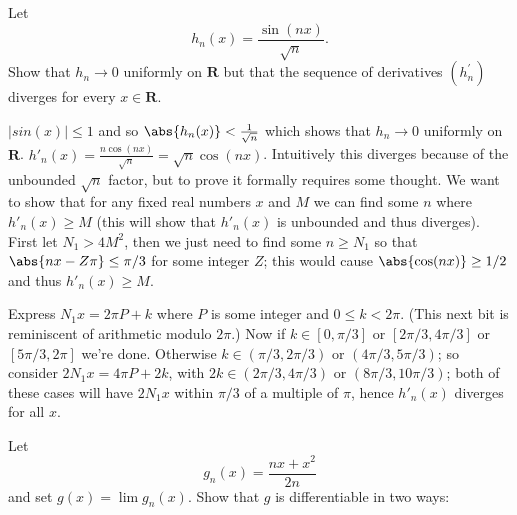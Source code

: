 \begin{exercise}
  Let
  $$
  h_{n}(x)=\frac{\sin (n x)}{\sqrt{n}} .
  $$
  Show that $h_{n} \rightarrow 0$ uniformly on $\mathbf{R}$ but that the sequence of derivatives $\left(h_{n}^{\prime}\right)$ diverges for every $x \in \mathbf{R}$.
\end{exercise}
\begin{solution}
\(|sin(x)| \leq 1\) and so \(\abs{h_n(x)} < \frac{1}{\sqrt{n}}\) which shows that \(h_n \to 0\) uniformly on \(\mathbf{R}\). \(h'_n(x) = \frac{n\cos(nx)}{\sqrt{n}} = \sqrt{n} \cos(nx)\). Intuitively this diverges because of the unbounded \(\sqrt{n}\) factor, but to prove it formally requires some thought. We want to show that for any fixed real numbers \(x\) and \(M\) we can find some \(n\) where \(h'_n(x) \geq M\) (this will show that \(h'_n(x)\) is unbounded and thus diverges). First let \(N_1 > 4M^2\), then we just need to find some \(n \geq N_1\) so that \(\abs{nx - Z\pi} \leq \pi/3\) for some integer \(Z\); this would cause \(\abs{\cos(nx)} \geq 1/2\) and thus \(h'_n(x) \geq M\).

Express \(N_1 x = 2 \pi P + k\) where \(P\) is some integer and \(0 \leq k < 2 \pi\). (This next bit is reminiscent of arithmetic modulo \(2\pi\).) Now if \(k \in [0, \pi/3]\) or \([2\pi/3, 4\pi/3]\) or \([5\pi/3, 2\pi]\) we're done. Otherwise \(k \in (\pi/3, 2\pi/3)\) or \((4\pi/3, 5\pi/3)\); so consider \(2N_1 x = 4 \pi P + 2k\), with \(2k \in (2\pi/3, 4 \pi/3)\) or \((8\pi/3, 10\pi/3)\); both of these cases will have \(2N_1 x\) within \(\pi/3\) of a multiple of \(\pi\), hence \(h'_n(x)\) diverges for all \(x\).
\end{solution}
\begin{exercise}
  Let
  $$
  g_{n}(x)=\frac{n x+x^{2}}{2 n}
  $$
  and set $g(x)=\lim g_{n}(x)$. Show that $g$ is differentiable in two ways:
\end{exercise}
